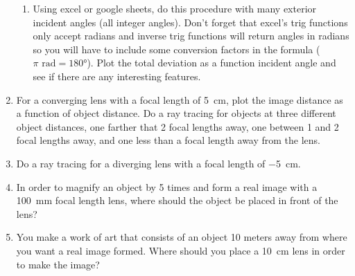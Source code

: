 \begin{enumerate}
\begin{enumerate}
	\item Using excel or google sheets, do this procedure with many exterior incident angles (all integer angles). Don't forget that excel's trig functions only accept radians and inverse trig functions will return angles in radians so you will have to include some conversion factors in the formula ($\pi \,\, \si{\radian} = \ang{180}$). Plot the total deviation as a function incident angle and see if there are any interesting features.
	 
\end{enumerate}

\newpage
\item
For a converging lens with a focal length of \SI{+5}{cm}, plot the image distance as a function of object distance. Do a ray tracing for objects at three different object distances, one farther that 2 focal lengths away, one between 1 and 2 focal lengths away, and one less than a focal length away from the lens. 

\newpage
\item
Do a ray tracing for a diverging lens with a focal length of \SI{-5}{cm}. 

\item
In order to magnify an object by 5 times and form a real image with a \SI{100}{mm} focal length lens, where should the object be placed in front of the lens?

\item
You make a work of art that consists of an object 10 meters away from where you want a real image formed. Where should you place a \SI{10}{cm} lens in order to make the image?

\newpage 

\ %

\newpage

\end{enumerate}